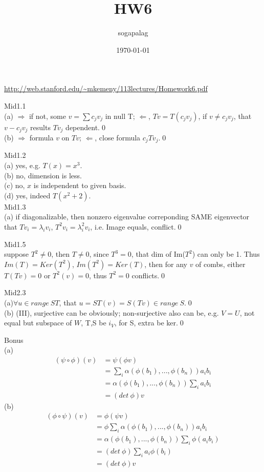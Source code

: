 \documentclass[paper=a4, fontsize=11pt]{scrartcl} %
\title{HW6}
\author{sogapalag}
\date{\normalsize\today}
\numberwithin{equation}{section} %
\numberwithin{figure}{section} %
\numberwithin{table}{section} %
\begin{document}
\maketitle 
\url{http://web.stanford.edu/~mkemeny/113lectures/Homework6.pdf}

Mid1.1\\
(a) $\Rightarrow$ if not, some $v=\sum c_jv_j$ in null T; $\Leftarrow$, $Tv=T(c_jv_j)$, if $v\neq c_jv_j$, that $v-c_jv_j$ results $Tv_j$ dependent.\qed\\
(b) $\Rightarrow$ formula $v$ on $Tv$; $\Leftarrow$, close formula $c_jTv_j$.\qed

Mid1.2\\
(a) yes, e.g. $T(x)=x^3$.\\
(b) no, dimension is less.\\
(c) no, $x$ is independent to given basis.\\
(d) yes, indeed $T(x^2+2)$.\\

Mid1.3\\
(a) if diagonalizable, then nonzero eigenvalue correponding SAME eigenvector that $Tv_i=\lambda_i v_i$, $T^2v_i = \lambda_i^2 v_i$, i.e. Image equals, conflict.\qed

Mid1.5\\
suppose $T^2\neq 0$, then $T\neq 0$, since $T^3=0$, that dim of Im($T^2$) can only be 1. Thus $Im(T)=Ker(T^2)$, $Im(T^2)=Ker(T)$, then for any $v$ of combs, either $T(Tv)=0$ or $T^2(v)=0$, thus $T^2=0$ conflicts.\qed

Mid2.3\\
(a)$\forall u\in range\ ST$, that $u=ST(v) = S(Tv)\in range\ S$.\qed\\
(b) (III), surjective can be obviously; non-surjective also can be, e.g. $V=U$, not equal but subspace of $W$, T,S be $i_V$, for S, extra be ker.\qed

Bonus\\
(a)
\begin{equation}\begin{split}
(\psi\circ\phi)(v) &= \psi(\phi v) \\
&= \sum_i \alpha(\phi(b_1),...,\phi(b_n)) a_ib_i \\
&= \alpha(\phi(b_1),...,\phi(b_n))\sum_ia_ib_i \\
&= (det\ \phi) v
\end{split}
\end{equation}
(b)
\begin{equation}\begin{split}
(\phi\circ\psi)(v) &= \phi(\psi v) \\
&= \phi\sum_i \alpha(\phi(b_1),...,\phi(b_n)) a_ib_i \\
&= \alpha(\phi(b_1),...,\phi(b_n))\sum_i\phi(a_ib_i) \\
&= (det\ \phi) \sum_ia_i\phi(b_i) \\
&= (det\ \phi) v
\end{split}
\end{equation}
\end{document}
